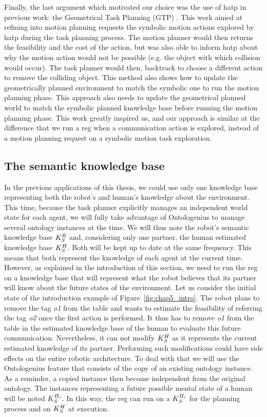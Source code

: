 Finally, the last argument which motivated our choice was the use of \acrshort{hatp} in previous work: the Geometrical Task Planning (GTP) \cite{gharbi_2015_combining}. This work aimed at refining into motion planning requests the symbolic motion actions explored by \acrshort{hatp} during the task planning process. The motion planner would then returns the feasibility and the cost of the action, but was also able to inform \acrshort{hatp} about why the motion action would not be possible (e.g. the object with which collision would occur). The task planner would then, backtrack to choose a different action to remove the colliding object. This method also shows how to update the geometrically planned environment to match the symbolic one to run the motion planning phase. This approach also needs to update the geometrical planned world to match the symbolic planned knowledge base before running the motion planning phase. This work greatly inspired us, and our approach is similar at the difference that we run a \acrshort{reg} when a communication action is explored, instead of a motion planning request on a symbolic motion task exploration.

\subsection{The semantic knowledge base}

In the previous applications of this thesis, we could use only one knowledge base representing both the robot's and human's knowledge about the environment. This time, because the task planner explicitly manages an independent world state for each agent, we will fully take advantage of Ontologenius to manage several ontology instances at the time. We will thus note the robot's semantic knowledge base $K_S^R$ and, considering only one partner, the human estimated knowledge base $K_S^H$. Both will be kept up to date at the same frequency. This means that both represent the knowledge of each agent at the current time. However, as explained in the introduction of this section, we need to run the \acrshort{reg} on a knowledge base that will represent what the robot believes that its partner will know about the future states of the environment. Let us consider the initial state of the introduction example of Figure~\ref{fig:chap5_intro}. The robot plans to remove the tag \textit{o1} from the table and wants to estimate the feasibility of referring the tag \textit{o2} once the first action is performed. It thus has to remove \textit{o1} from the table in the estimated knowledge base of the human to evaluate this future communication. Nevertheless, it can not modify $K_S^H$ as it represents the current estimated knowledge of its partner. Performing such modifications could have side effects on the entire robotic architecture. To deal with that we will use the Ontologenius feature that consists of the copy of an existing ontology instance. As a reminder, a copied instance then become independent from the original ontology. The instances representing a future possible mental state of a human will be noted $K_S^{H_i}$. In this way, the \acrshort{reg} can run on a $K_S^{H_i}$ for the planning process and on $K_S^H$ at execution.

